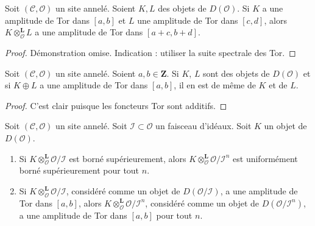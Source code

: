 \begin{lemma}
\label{lemma-tensor-tor-amplitude}
Soit $(\mathcal{C}, \mathcal{O})$ un site annelé. Soient $K, L$ des objets
de $D(\mathcal{O})$. Si $K$ a une amplitude de Tor dans $[a, b]$ et $L$ une
amplitude de Tor dans $[c, d]$, alors $K \otimes_\mathcal{O}^\mathbf{L} L$
a une amplitude de Tor dans $[a + c, b + d]$.
\end{lemma}

\begin{proof}
Démonstration omise. Indication : utiliser la suite spectrale des Tor.
\end{proof}

\begin{lemma}
\label{lemma-summands-tor-amplitude}
Soit $(\mathcal{C}, \mathcal{O})$ un site annelé. Soient
$a, b \in \mathbf{Z}$. Si $K$, $L$ sont des objets de $D(\mathcal{O})$ et si
$K \oplus L$ a une amplitude de Tor dans $[a, b]$, il en est de même de $K$
et de $L$.
\end{lemma}

\begin{proof}
C'est clair puisque les foncteurs Tor sont additifs.
\end{proof}

\begin{lemma}
\label{lemma-bounded}
Soit $(\mathcal{C}, \mathcal{O})$ un site annelé. Soit
$\mathcal{I} \subset \mathcal{O}$ un faisceau d'idéaux. Soit $K$ un objet
de $D(\mathcal{O})$.
\begin{enumerate}
\item Si $K \otimes_\mathcal{O}^\mathbf{L} \mathcal{O}/\mathcal{I}$ est
borné supérieurement, alors
$K \otimes_\mathcal{O}^\mathbf{L} \mathcal{O}/\mathcal{I}^n$
est uniformément borné supérieurement pour tout $n$.
\item Si $K \otimes_\mathcal{O}^\mathbf{L} \mathcal{O}/\mathcal{I}$,
considéré comme un objet de $D(\mathcal{O}/\mathcal{I})$, a une amplitude de
Tor dans $[a, b]$, alors
$K \otimes_\mathcal{O}^\mathbf{L} \mathcal{O}/\mathcal{I}^n$, considéré
comme un objet de $D(\mathcal{O}/\mathcal{I}^n)$, a une amplitude de Tor dans
$[a, b]$ pour tout $n$.
\end{enumerate}
\end{lemma}

